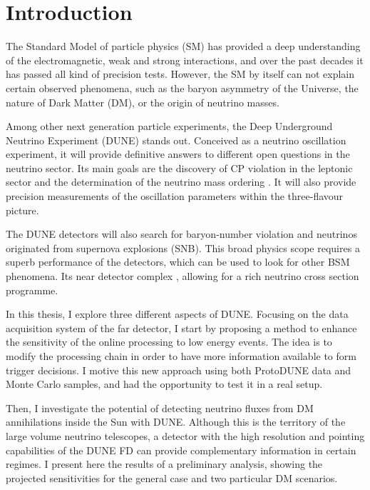 \chapter{Introduction}
\label{chapter:introduction}

The Standard Model of particle physics (SM) has provided a deep understanding of the electromagnetic, weak and strong interactions, and over the past decades it has passed all kind of precision tests. However, the SM by itself can not explain certain observed phenomena, such as the baryon asymmetry of the Universe, the nature of Dark Matter (DM), or the origin of neutrino masses.

Among other next generation particle experiments, the Deep Underground Neutrino Experiment (DUNE) stands out. Conceived as a neutrino oscillation experiment, it will provide definitive answers to different open questions in the neutrino sector. Its main goals are the discovery of CP violation in the leptonic sector and the determination of the neutrino mass ordering \cite{DUNE2020TDR1}. It will also provide precision measurements of the oscillation parameters within the three-flavour picture.

The DUNE detectors will also search for baryon-number violation and neutrinos originated from supernova explosions (SNB). This broad physics scope requires a superb performance of the detectors, which can be used to look for other BSM phenomena. Its near detector complex , allowing for a rich neutrino cross section programme.

In this thesis, I explore three different aspects of DUNE. Focusing on the data acquisition system of the far detector, I start by proposing a method to enhance the sensitivity of the online processing to low energy events. The idea is to modify the processing chain in order to have more information available to form trigger decisions. I motive this new approach using both ProtoDUNE data and Monte Carlo samples, and had the opportunity to test it in a real setup.

Then, I investigate the potential of detecting neutrino fluxes from DM annihilations inside the Sun with DUNE. Although this is the territory of the large volume neutrino telescopes, a detector with the high resolution and pointing capabilities of the DUNE FD can provide complementary information in certain regimes. I present here the results of a preliminary analysis, showing the projected sensitivities for the general case and two particular DM scenarios.


